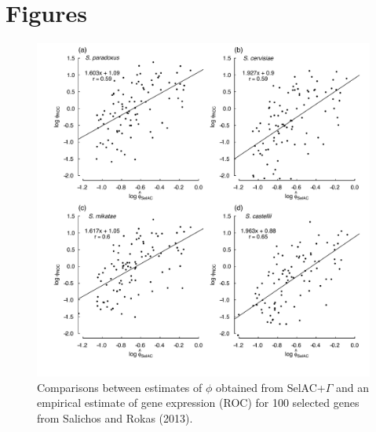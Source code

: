 \documentclass{article}
\begin{document}
\clearpage %

\section*{Figures}

\begin{figure}[H]
  \centering
  \includegraphics[width=0.9\linewidth]{FIGURE_1_SelACwG_vs_ROC_by_spp.pdf}
  \caption{Comparisons between estimates of $\phi$ obtained from SelAC+$\Gamma$ and an empirical estimate of gene expression (ROC) for 100 selected genes from Salichos and Rokas (2013).
  } 
  \label{fig:PhivsROC}
\end{figure}
\end{document}

